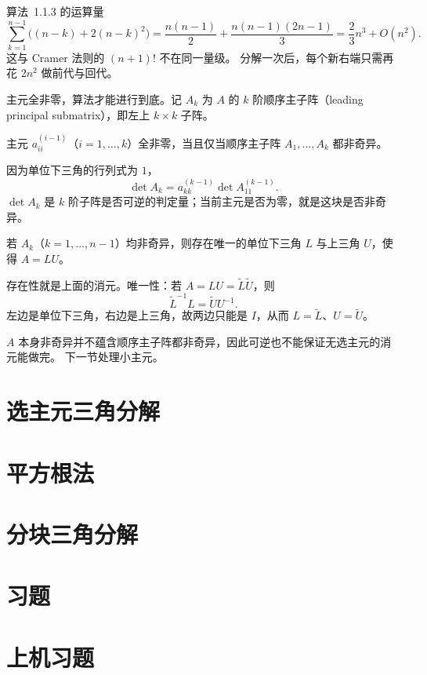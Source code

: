 算法~1.1.3 的运算量
\begin{equation}
\sum_{k=1}^{n-1}\bigl((n-k)+2(n-k)^{2}\bigr)
=\frac{n(n-1)}{2}+\frac{n(n-1)(2n-1)}{3}
=\frac{2}{3}n^{3}+O(n^{2}).
\end{equation}
这与 Cramer 法则的 $(n+1)!$ 不在同一量级。
分解一次后，每个新右端只需再花 $2n^{2}$ 做前代与回代。

主元全非零，算法才能进行到底。记 $A_k$ 为 $A$ 的 $k$ 阶顺序主子阵（leading principal submatrix），即左上 $k\times k$ 子阵。

\quad
主元 $a_{ii}^{(i-1)}$（$i=1,\ldots,k$）全非零，当且仅当顺序主子阵 $A_1,\ldots,A_k$ 都非奇异。


因为单位下三角的行列式为 $1$，
\begin{equation}
\det A_k=a_{kk}^{(k-1)}\det A_{11}^{(k-1)}.
\end{equation}
$\det A_k$ 是 $k$ 阶子阵是否可逆的判定量；当前主元是否为零，就是这块是否非奇异。

\quad
若 $A_k$（$k=1,\ldots,n-1$）均非奇异，则存在唯一的单位下三角 $L$ 与上三角 $U$，使得 $A=LU$。

存在性就是上面的消元。唯一性：若 $A=LU=\tilde L\tilde U$，则
\[
\tilde L^{-1}L=\tilde U U^{-1}.
\]
左边是单位下三角，右边是上三角，故两边只能是 $I$，从而 $L=\tilde L$、$U=\tilde U$。

$A$ 本身非奇异并不蕴含顺序主子阵都非奇异，因此可逆也不能保证无选主元的消元能做完。
下一节处理小主元。

\section{选主元三角分解}

\pending

\section{平方根法}

\pending

\section{分块三角分解}

\pending

\section{习题}

\pending

\section{上机习题}

\pending
